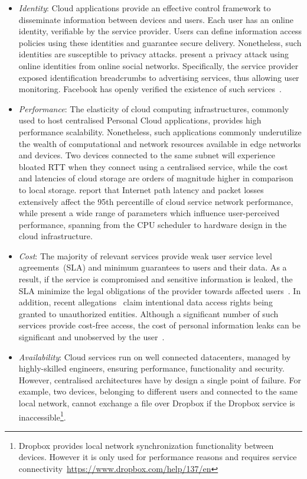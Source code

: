 \begin{itemize}
  \item{\it Identity}\/: Cloud applications provide an effective control
    framework to disseminate information between devices and users.  Each user
    has an online identity, verifiable by the service provider.
    Users can define information access policies using these identities and
    guarantee secure delivery. Nonetheless, such identities are susceptible  to
    privacy attacks.  present a privacy attack using
    online identities from online social networks. Specifically,
    the service provider exposed identification breadcrumbs to advertising
    services, thus allowing user monitoring.  Facebook has openly verified the
    existence of such services~.  

\item {\it Performance}\/: The elasticity of cloud computing infrastructures,
  commonly used to host centralised Personal Cloud applications, provides
  high performance scalability.  Nonetheless, such applications 
  commonly underutilize the wealth of computational and network resources
  available in edge networks and devices.  Two devices connected to the same
  subnet will experience bloated RTT when they connect using a centralised
  service, while the cost and latencies of cloud storage are orders of
  magnitude higher in comparison to local storage.  report
  that Internet path latency and packet losses extensively affect the 95th
  percentille of cloud service network performance, while  present
  a wide range of parameters which influence user-perceived performance,
  spanning from the CPU scheduler to hardware design in the cloud infrastructure.

\item {\it Cost}\/: 
  The majority of relevant services provide weak user service level
  agreements~(SLA) and minimum guarantees to users and their data. As a result,
  if the service is compromised and sensitive information is leaked, the SLA
  minimize the legal obligations of the provider towards affected
  users~. In addition, recent
  allegations~ claim intentional data access rights
  being granted to unauthorized entities.  Although a significant number of such
  services provide cost-free access, the cost of personal information leaks can
  be significant and unobserved by the user~\cite{Liu2011}.

\item {\it Availability}\/: Cloud services run on well connected
  datacenters, managed by highly-skilled engineers, ensuring performance,
  functionality and security. However, centralised architectures have  by design a single
  point of failure. For example, two devices, belonging to different
  users and connected to the same local network, cannot exchange a file over
  Dropbox if the Dropbox service is inaccessible\footnote{Dropbox provides
    local network synchronization functionality between devices. However it is only
    used for performance reasons and requires service
    connectivity~\url{https://www.dropbox.com/help/137/en}}. 


\end{itemize}
